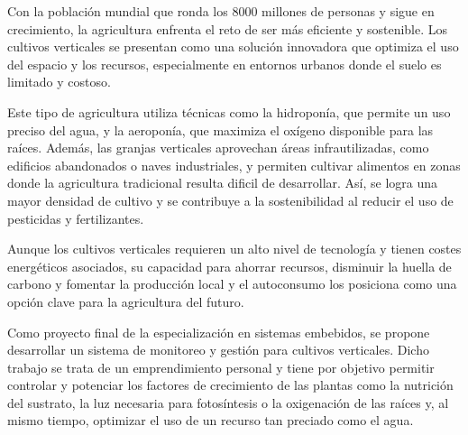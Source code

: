\documentclass[
11pt, %
]{charter}
\begin{document}




Con la población mundial que ronda los 8000 millones de personas y sigue en crecimiento, la agricultura enfrenta el reto de ser más eficiente y sostenible. Los cultivos verticales se presentan como una solución innovadora que optimiza el uso del espacio y los recursos, especialmente en entornos urbanos donde el suelo es limitado y costoso.

Este tipo de agricultura utiliza técnicas como la hidroponía, que permite un uso preciso del agua, y la aeroponía, que maximiza el oxígeno disponible para las raíces. Además, las granjas verticales aprovechan áreas infrautilizadas, como edificios abandonados o naves industriales, y permiten cultivar alimentos en zonas donde la agricultura tradicional resulta dificil de desarrollar. Así, se logra una mayor densidad de cultivo y se contribuye a la sostenibilidad al reducir el uso de pesticidas y fertilizantes.

Aunque los cultivos verticales requieren un alto nivel de tecnología y tienen costes energéticos asociados, su capacidad para ahorrar recursos, disminuir la huella de carbono y fomentar la producción local y el autoconsumo los posiciona como una opción clave para la agricultura del futuro.

Como proyecto final de la especialización en sistemas embebidos, se propone desarrollar un sistema de monitoreo y gestión para cultivos verticales. Dicho trabajo se trata de un emprendimiento personal y tiene por objetivo permitir controlar y potenciar los factores de crecimiento de las plantas como la nutrición del sustrato, la luz necesaria para fotosíntesis o la oxigenación de las raíces y, al mismo tiempo, optimizar el uso de un recurso tan preciado como el agua.
\end{document}
